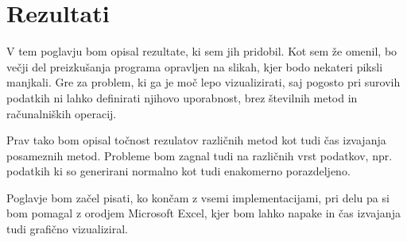 \chapter{Rezultati}
V tem poglavju bom opisal rezultate, ki sem jih pridobil. Kot sem že omenil, bo večji del preizkušanja programa opravljen na slikah, kjer bodo nekateri piksli manjkali. Gre za problem, ki ga je moč lepo vizualizirati, saj pogosto pri surovih podatkih ni lahko definirati njihovo uporabnost, brez številnih metod in računalniških operacij. 

Prav tako bom opisal točnost rezulatov različnih metod kot tudi čas izvajanja posameznih metod. Probleme bom zagnal tudi na različnih vrst podatkov, npr. podatkih ki so generirani normalno kot tudi enakomerno porazdeljeno.

Poglavje bom začel pisati, ko končam z vsemi implementacijami, pri delu pa si bom pomagal z orodjem Microsoft Excel, kjer bom lahko napake in čas izvajanja tudi grafično vizualiziral. 